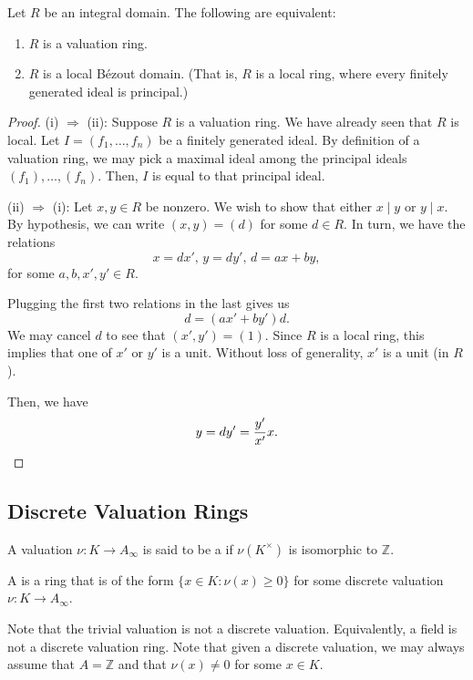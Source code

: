 \documentclass[12pt]{article}
\begin{document}
\begin{prop} \label{prop:valuation-local-bezout}
	Let $R$ be an integral domain. The following are equivalent:
	\begin{enumerate}[label=(\roman*)]
		\item $R$ is a valuation ring.
		\item $R$ is a local B\'ezout domain. (That is, $R$ is a local ring, where every finitely generated ideal is principal.)
	\end{enumerate}
\end{prop}
\begin{proof} 
	(i) $\Rightarrow$ (ii): Suppose $R$ is a valuation ring. We have already seen that $R$ is local. Let $I = (f_{1}, \ldots, f_{n})$ be a finitely generated ideal. By definition of a valuation ring, we may pick a maximal ideal among the principal ideals $(f_{1}), \ldots, (f_{n})$. Then, $I$ is equal to that principal ideal.

	(ii) $\Rightarrow$ (i): Let $x, y \in R$ be nonzero. We wish to show that either $x \mid y$ or $y \mid x$. \newline
	By hypothesis, we can write $(x, y) = (d)$ for some $d \in R$. In turn, we have the relations
	\begin{equation*} 
		x = dx',\, y = dy',\, d = ax + by,
	\end{equation*}
	for some $a, b, x', y' \in R$. 

	Plugging the first two relations in the last gives us
	\begin{equation*} 
		d = (ax' + by')d.
	\end{equation*}
	We may cancel $d$ to see that $(x', y') = (1)$. Since $R$ is a local ring, this implies that one of $x'$ or $y'$ is a unit. Without loss of generality, $x'$ is a unit (in $R$).

	Then, we have
	\begin{equation*} 
		y = dy' = \frac{y'}{x'} x. \qedhere
	\end{equation*}
\end{proof}

\subsection{Discrete Valuation Rings}

\begin{defn}
	A valuation $\nu : K \to A_{\infty}$ is said to be a  if $\nu(K^{\times})$ is isomorphic to $\mathbb{Z}$.

	A  is a ring that is of the form $\{x \in K : \nu(x) \ge 0\}$ for some discrete valuation $\nu : K \to A_{\infty}$.
\end{defn}
Note that the trivial valuation is not a discrete valuation. Equivalently, a field is not a discrete valuation ring. \newline
Note that given a discrete valuation, we may always assume that $A = \mathbb{Z}$ and that $\nu(x) \neq 0$ for some $x \in K$.
\end{document}

